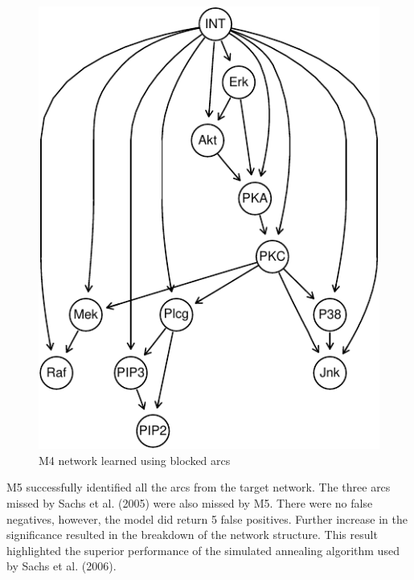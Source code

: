 \documentclass[twocol]{ametsoc}
\begin{document}
\begin{figure}

{\centering \includegraphics{paper_files/figure-latex/fig7-1} 

}

\caption{M4 network learned using blocked arcs}\label{fig:fig7}
\end{figure}

M5 successfully identified all the arcs from the target network. The
three arcs missed by Sachs et al. (2005) were also missed by M5. There
were no false negatives, however, the model did return 5 false
positives. Further increase in the significance resulted in the
breakdown of the network structure. This result highlighted the superior
performance of the simulated annealing algorithm used by Sachs et al.
(2006).
\end{document}
